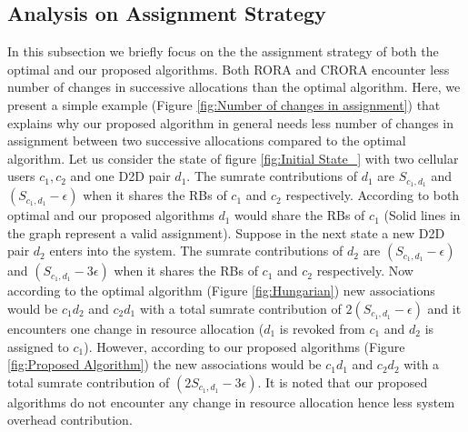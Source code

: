 \documentclass[times]{dacauth}
\begin{document}


\subsection{Analysis on Assignment Strategy}\label{assighment stragegy}
\smallskip
\noindent 
In this subsection we briefly focus on the the assignment strategy of both the optimal and our proposed algorithms. Both RORA and CRORA encounter less number of changes in successive allocations than the optimal algorithm. Here, we present a simple example  (Figure \ref{fig:Number of changes in assignment}) that explains why our proposed algorithm in general needs less number of changes in assignment between two successive allocations compared to the optimal algorithm. Let us consider the state of figure \ref{fig:Initial State_} with two cellular users $ c_{1}, c_{2}$  and one D2D pair $d_{1}$. The sumrate contributions of $d_{1}$ are $S_{c_1,d_1}$ and $(S_{c_1, d_1}-\epsilon)$ when it shares the RBs of $ c_{1}$ and $ c_{2}$ respectively. According to both optimal and our proposed algorithms $d_{1}$ would share the RBs of $c_{1}$ (Solid lines in the graph represent a valid assignment). Suppose in the next state a new D2D pair $d_{2}$ enters into the system. The sumrate contributions of $d_{2}$ are $(S_{c_1, d_1}-\epsilon)$ and $(S_{c_1, d_1}-3\epsilon)$ when it shares the RBs of $ c_{1}$ and $ c_{2}$ respectively. Now according to the optimal algorithm (Figure \ref{fig:Hungarian}) new associations would be $c_1d_2$ and $c_2d_1$ with a total sumrate contribution of $2(S_{c_1, d_1}-\epsilon)$ and it encounters one change in resource allocation ($d_{1}$ is revoked from $c_{1}$ and $d_{2}$ is assigned to $c_{1}$). However, according to our proposed algorithms (Figure \ref{fig:Proposed Algorithm}) the new associations would be $c_1d_1$ and $c_2d_2$ with a total sumrate contribution of $(2S_{c_1, d_1}-3\epsilon)$. It is noted that our proposed algorithms do not encounter any change in resource allocation hence less system overhead contribution.   
\end{document}
